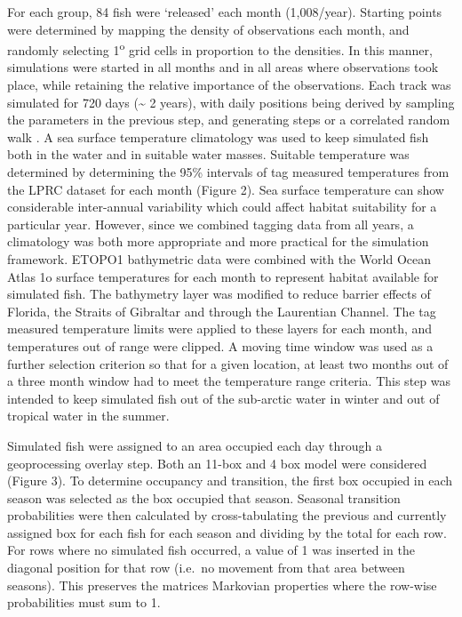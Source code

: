 \documentclass[
  authoryear,
  preprint,
  5p,
  onecolumn]{elsarticle}
\begin{document}
For each group, 84 fish were `released' each month (1,008/year).
Starting points were determined by mapping the density of observations
each month, and randomly selecting 1\textsuperscript{o} grid cells in
proportion to the densities. In this manner, simulations were started in
all months and in all areas where observations took place, while
retaining the relative importance of the observations. Each track was
simulated for 720 days (\textasciitilde{} 2 years), with daily positions
being derived by sampling the parameters in the previous step, and
generating steps or a correlated random walk \citep{galuardi2014}. A sea
surface temperature climatology \citep{boyer2013} was used to keep
simulated fish both in the water and in suitable water masses. Suitable
temperature was determined by determining the 95\% intervals of tag
measured temperatures from the LPRC dataset for each month (Figure 2).
Sea surface temperature can show considerable inter-annual variability
which could affect habitat suitability for a particular year. However,
since we combined tagging data from all years, a climatology was both
more appropriate and more practical for the simulation framework. ETOPO1
bathymetric data \citep{amante2009} were combined with the World Ocean
Atlas 1o surface temperatures for each month to represent habitat
available for simulated fish. The bathymetry layer was modified to
reduce barrier effects of Florida, the Straits of Gibraltar and through
the Laurentian Channel. The tag measured temperature limits were applied
to these layers for each month, and temperatures out of range were
clipped. A moving time window was used as a further selection criterion
so that for a given location, at least two months out of a three month
window had to meet the temperature range criteria. This step was
intended to keep simulated fish out of the sub-arctic water in winter
and out of tropical water in the summer.

Simulated fish were assigned to an area occupied each day through a
geoprocessing overlay step. Both an 11-box and 4 box model were
considered (Figure 3). To determine occupancy and transition, the first
box occupied in each season was selected as the box occupied that
season. Seasonal transition probabilities were then calculated by
cross-tabulating the previous and currently assigned box for each fish
for each season and dividing by the total for each row. For rows where
no simulated fish occurred, a value of 1 was inserted in the diagonal
position for that row (i.e.~no movement from that area between seasons).
This preserves the matrices Markovian properties where the row-wise
probabilities must sum to 1.
\end{document}
